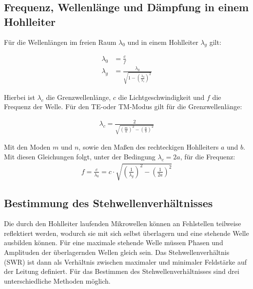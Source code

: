 \subsection{Frequenz, Wellenlänge und Dämpfung in einem Hohlleiter}
Für die Wellenlängen im freien Raum $\lambda_0$ und in einem Hohlleiter $\lambda_g$ gilt:

\begin{align}
  \lambda_0 &= \frac{c}{f} \\
  \lambda_g &= \frac{\lambda_0}{\sqrt{1- \left( \frac{\lambda_0}{\lambda_c} \right)^2}}
\end{align}

Hierbei ist $\lambda_c$ die Grenzwellenlänge, $c$ die Lichtgeschwindigkeit und $f$
die Frequenz der Welle. Für den TE-oder TM-Modus gilt für die
Grenzwellenlänge:

\begin{align}
  \lambda_c = \frac{2}{\sqrt{\left(\frac{m}{a} \right)^2 - \left(\frac{n}{b} \right)^2}}
\end{align}

Mit den Moden $m$ und $n$, sowie den Maßen des rechteckigen Hohlleiters $a$ und $b$.
Mit diesen Gleichungen folgt, unter der Bedingung $\lambda_c=2a$, für die Frequenz:
\begin{align}
  f = \frac{c}{\lambda_0} = c \cdot \sqrt{\left(\frac{1}{\lambda_g}\right)^2 - \left(\frac{1}{2a}\right)^2}
\end{align}




\subsection{Bestimmung des Stehwellenverhältnisses}
Die durch den Hohlleiter laufenden Mikrowellen können an Fehlstellen teilweise reflektiert
werden, wodurch sie mit sich selbst überlagern und eine stehende Welle ausbilden können.
Für eine maximale stehende Welle müssen Phasen und Amplituden der überlagernden Wellen
gleich sein. Das Stehwellenverhältnis (SWR) ist dann als Verhältnis zwischen maximaler
und minimaler Feldstärke auf der Leitung definiert. Für das Bestimmen des Stehwellenverhältnisses
sind drei unterschiedliche Methoden möglich.

